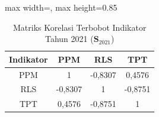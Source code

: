\begin{table}[H]
\centering
\caption{Matriks Korelasi Terbobot Indikator Tahun 2021 ($\mathbf{S}_{2021}$)} \label{tab:sample1matriks_intra_loading_2021}
\begin{adjustbox}{max width=\textwidth, max height=0.85\textheight}
\begin{tabular}{|c|c|c|c|}
\hline
\textbf{Indikator} & \textbf{PPM} & \textbf{RLS} & \textbf{TPT} \\
\hline
PPM & 1 & -0,8307 & 0,4576 \\
RLS & -0,8307 & 1 & -0,8751 \\
TPT & 0,4576 & -0,8751 & 1 \\
\hline
\end{tabular}
\end{adjustbox}
\end{table}